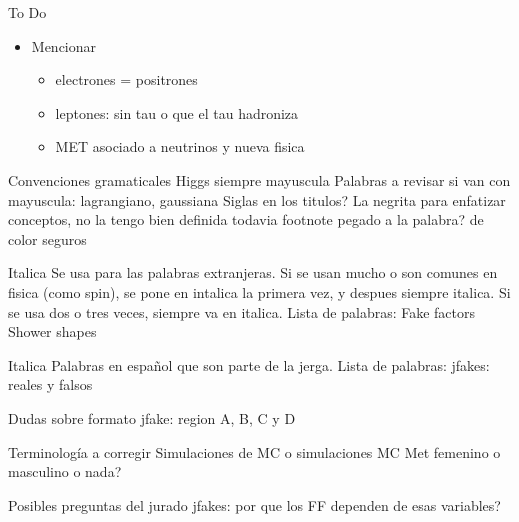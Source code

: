 
{\LARGE To Do}

\begin{itemize}
	\item Mencionar
	\begin{itemize}
		\item electrones = positrones %
		\item leptones: sin tau o que el tau hadroniza
		\item MET asociado a neutrinos y nueva fisica
	\end{itemize}
\end{itemize}


{Convenciones gramaticales}
Higgs siempre mayuscula
Palabras a revisar si van con mayuscula: lagrangiano, gaussiana
Siglas en los titulos?
La negrita para enfatizar conceptos, no la tengo bien definida todavia
footnote pegado a la palabra? de color seguros

{Italica}
Se usa para las palabras extranjeras. Si se usan mucho o son comunes en fisica (como spin), se pone en intalica la primera vez, y despues siempre italica. Si se usa dos o tres veces, siempre va en italica.
Lista de palabras:
Fake factors
Shower shapes

{Italica}
Palabras en español que son parte de la jerga.
Lista de palabras:
jfakes: reales y falsos

{Dudas sobre formato}
jfake: region A, B, C y D


{Terminología a corregir}
Simulaciones de MC o simulaciones MC
Met femenino o masculino o nada?

{Posibles preguntas del jurado}
jfakes: por que los FF dependen de esas variables?





